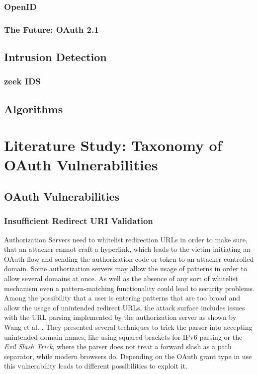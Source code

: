 \documentclass[
    fontsize=12pt,
    headings=small,
    parskip=half,           %
    bibliography=totoc,
    numbers=noenddot,       %
    open=any,               %
    ]{scrreprt}
\begin{document}
\subsection{OpenID}

\subsection{The Future: OAuth 2.1}

\section{Intrusion Detection}

\subsection{zeek IDS}

\section{Algorithms}

\chapter{Literature Study: Taxonomy of OAuth Vulnerabilities}
\section{OAuth Vulnerabilities}

\subsection{Insufficient Redirect URI Validation \cite{lodderstedt2020oauth} \cite{wang2019make}}
Authorization Servers need to whitelist redirection URLs in order to make sure, that an attacker cannot craft a hyperlink, which leads to the victim initiating an OAuth flow and sending the authorization code or token to an attacker-controlled domain. Some authorization servers may allow the usage of patterns in order to allow several domains at once. As well as the absence of any sort of whitelist mechanism even a pattern-matching functionality could lead to security problems. Among the possibility that a user is entering patterns that are too broad and allow the usage of unintended redirect URLs, the attack surface includes issues with the URL parsing implemented by the authorization server as shown by Wang et al. \cite{wang2019make}. They presented several techniques to trick the parser into accepting unintended domain names, like using squared brackets for IPv6 parsing or the \emph{Evil Slash Trick}, where the parser does not treat a forward slash as a path separator, while modern browsers do. Depending on the OAuth grant type in use this vulnerability leads to different possibilities to exploit it.
\end{document}

